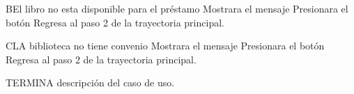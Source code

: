 		\begin{UCtrayectoriaA}{B}{El libro no esta disponible para el préstamo}
			\UCpaso[\UCsist] Mostrara el mensaje 
			\UCpaso[\UCactor] Presionara el botón 			
			\UCpaso[\UCsist] Regresa al paso 2 de la trayectoria principal.
		\end{UCtrayectoriaA}
		
		\begin{UCtrayectoriaA}{C}{LA biblioteca no tiene convenio}
			\UCpaso[\UCsist] Mostrara el mensaje 
			\UCpaso[\UCactor] Presionara el botón 
			\UCpaso[\UCsist] Regresa al paso 2 de la trayectoria principal.
		\end{UCtrayectoriaA}
TERMINA descripción del caso de uso.
